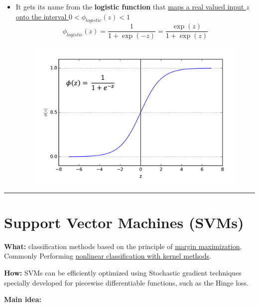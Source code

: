 \documentclass[12pt, a4paper]{article}
\let\stdsection\section
\renewcommand\section{\newpage\stdsection} %
\begin{document}
\begin{itemize}
  \item It gets its name from the \textbf{logistic function} that \uline{maps a real valued input $z$ onto the interval $0 < \phi_{logistic}(z) < 1$}
  $$
  \phi_{logistic}(z) = \frac{1}{1 + \exp(-z)} = \frac{\exp(z)}{1+\exp(z)}
  $$
  \begin{figure}[H]
    \centering  %
      \includegraphics[width=0.7\columnwidth]{images/logistic-function.png}
      \label{fig:logistic-function}
  \end{figure}
\end{itemize}



\begin{center}\rule{3in}{0.4pt}\end{center}




















\section{Support Vector Machines (SVMs)}\label{support-vector-machines}

\textbf{What:} classification methods based on the principle of \uline{margin maximization}. Commonly Performing \uline{nonlinear classification with kernel methods}.

\textbf{How:} SVMs can be efficiently optimized using Stochastic gradient techniques specially developed for piecewise differentiable functions, such as the Hinge loss.

\textbf{Main idea:}
\end{document}
